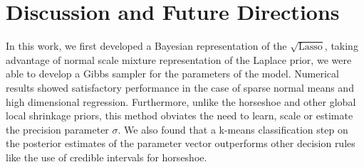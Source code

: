 \documentclass[ba]{imsart}
\def\sql{$\sqrt{\text{Lasso}}$}
\begin{document}
%



\section{Discussion and Future Directions}\label{sec:future}

In this work, we first developed a Bayesian representation of the \sql, taking advantage of normal scale mixture representation of the Laplace prior, we were able to develop a Gibbs sampler for the parameters of the model. Numerical results showed satisfactory performance in the case of sparse normal means and high dimensional regression. Furthermore, unlike the horseshoe and other global local shrinkage priors, this method obviates the need to learn, scale or estimate the precision parameter $\sigma$. We also found that a k-means classification step on the posterior estimates of the parameter vector outperforms other decision rules like the use of credible intervals for horseshoe. 
\end{document}

